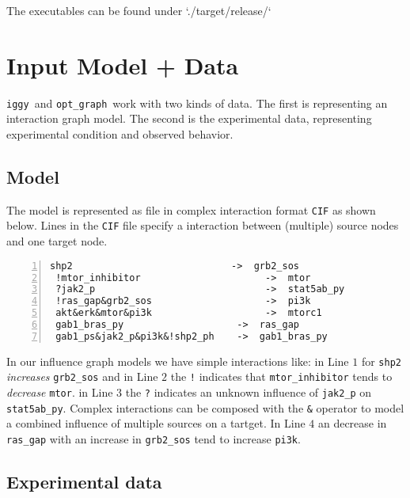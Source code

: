 \documentclass{article}
\newcommand\iggy{\texttt{iggy}}
\newcommand\optgraph{\texttt{opt\_graph}}
\begin{document}
The executables can be found under `./target/release/`



\section{Input Model + Data}

\iggy\ and \optgraph\ work with two kinds of data. 
The first is representing an interaction graph model. 
The second is the experimental data, representing experimental condition and observed behavior.

\subsection{Model}

The model is represented as file in complex interaction format \texttt{CIF} as shown below.
Lines in the \texttt{CIF} file specify a interaction between (multiple) source nodes and one target node.

\begin{Verbatim}[frame=single,numbers=left]
 shp2	                         ->  grb2_sos
 !mtor_inhibitor                      ->  mtor
 ?jak2_p                              ->  stat5ab_py
 !ras_gap&grb2_sos                    ->  pi3k
 akt&erk&mtor&pi3k                    ->  mtorc1
 gab1_bras_py	                 ->  ras_gap
 gab1_ps&jak2_p&pi3k&!shp2_ph	 ->  gab1_bras_py
\end{Verbatim}

In our influence graph models we have simple interactions like:
in Line $1$ for \texttt{shp2} \emph{increases} \texttt{grb2\_sos}
and in Line $2$ the \texttt{!} indicates that \texttt{mtor\_inhibitor} tends to \emph{decrease} \texttt{mtor}.
in Line $3$ the \texttt{?} indicates an unknown influence of \texttt{jak2\_p} on \texttt{stat5ab\_py}.
Complex interactions can be composed with the \texttt{\&} operator to model a combined influence of multiple sources on a tartget.
In Line $4$ an decrease in  \texttt{ras\_gap} with an increase in  \texttt{grb2\_sos} tend to increase  \texttt{pi3k}.

 
\subsection{Experimental data}
\end{document}
